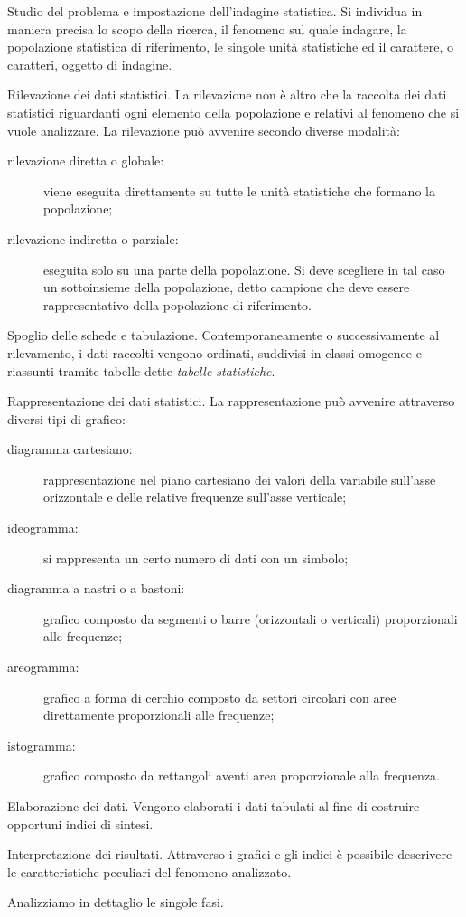 \begin{enumeratea}
\item Studio del problema e impostazione dell'indagine statistica.
Si individua in maniera precisa lo scopo della ricerca, il fenomeno sul 
quale indagare, la popolazione statistica di riferimento,
le singole unità statistiche ed il carattere, o caratteri, oggetto di 
indagine.
\item Rilevazione dei dati statistici.
La rilevazione non è altro che la raccolta dei dati statistici riguardanti 
ogni elemento della popolazione e relativi al fenomeno che si vuole 
analizzare.
La rilevazione può avvenire secondo diverse modalità:
\begin{description}
\item [rilevazione diretta o globale:] viene eseguita direttamente su tutte 
le unità statistiche che formano la popolazione;
\item [rilevazione indiretta o parziale:] eseguita solo su una parte della 
popolazione. Si deve scegliere in tal caso un sottoinsieme della 
popolazione,
detto campione che deve essere rappresentativo della popolazione di 
riferimento.
\end{description}
\item Spoglio delle schede e tabulazione.
Contemporaneamente o successivamente al rilevamento, i dati raccolti 
vengono ordinati, suddivisi in classi omogenee e riassunti tramite tabelle 
dette \emph{tabelle statistiche}.
\item Rappresentazione dei dati statistici.
La rappresentazione può avvenire attraverso diversi tipi di grafico:
\begin{description}
\item [diagramma cartesiano:] rappresentazione nel piano cartesiano dei 
valori della variabile sull'asse orizzontale e delle relative frequenze 
sull'asse verticale;
\item [ideogramma:]si rappresenta un certo numero di dati con un simbolo;
\item [diagramma a nastri o a bastoni:]grafico composto da segmenti o barre 
(orizzontali o verticali) proporzionali alle frequenze;
\item [areogramma:]grafico a forma di cerchio composto da settori circolari 
con aree direttamente proporzionali alle frequenze;
\item [istogramma:] grafico composto da rettangoli aventi area 
proporzionale alla frequenza.
\end{description}
\item Elaborazione dei dati.
Vengono elaborati i dati tabulati al fine di costruire opportuni indici di 
sintesi.
\item Interpretazione dei risultati.
Attraverso i grafici e gli indici è possibile descrivere le caratteristiche 
peculiari del fenomeno analizzato.
\end{enumeratea}
Analizziamo in dettaglio le singole fasi.

